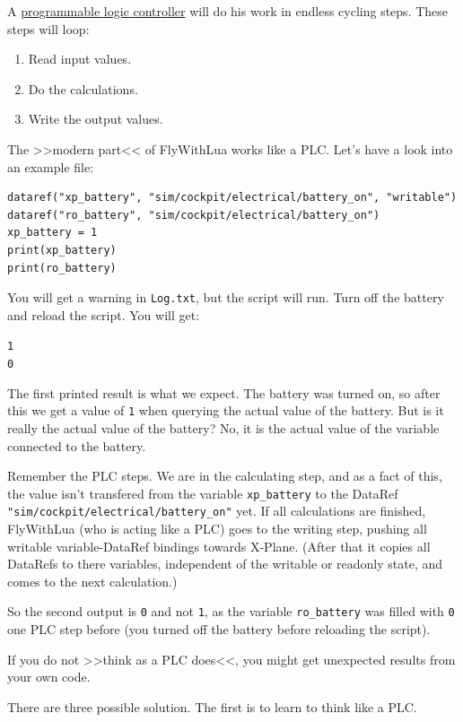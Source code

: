 \documentclass[11pt,parskip=half,a4paper]{scrartcl}
\begin{document}
A \href{http://en.wikipedia.org/wiki/Programmable_logic_controller}{programmable logic controller} will do his work in endless cycling steps. These steps will loop:

\begin{enumerate}
	\item Read input values.
	\item Do the calculations.
	\item Write the output values.
\end{enumerate}

The >>modern part<< of FlyWithLua works like a PLC. Let's have a look into an example file:

\begin{lstlisting}
dataref("xp_battery", "sim/cockpit/electrical/battery_on", "writable")
dataref("ro_battery", "sim/cockpit/electrical/battery_on")
xp_battery = 1
print(xp_battery)
print(ro_battery)
\end{lstlisting}

You will get a warning in \verb|Log.txt|, but the script will run. Turn off the battery and reload the script. You will get:

\verb|1|\\
\verb|0|

The first printed result is what we expect. The battery was turned on, so after this we get a value of \verb|1| when querying the actual value of the battery. But is it really the actual value of the battery? No, it is the actual value of the variable connected to the battery.

Remember the PLC steps. We are in the calculating step, and as a fact of this, the value isn't transfered from the variable \verb|xp_battery| to the DataRef \verb|"sim/cockpit/electrical/battery_on"| yet. If all calculations are finished, FlyWithLua (who is acting like a PLC) goes to the writing step, pushing all writable variable-DataRef bindings towards X-Plane. (After that it copies all DataRefs to there variables, independent of the writable or readonly state, and comes to the next calculation.)

So the second output is \verb|0| and not \verb|1|, as the variable \verb|ro_battery| was filled with \verb|0| one PLC step before (you turned off the battery before reloading the script).

If you do not >>think as a PLC does<<, you might get unexpected results from your own code.

There are three possible solution. The first is to learn to think like a PLC.
\end{document}
